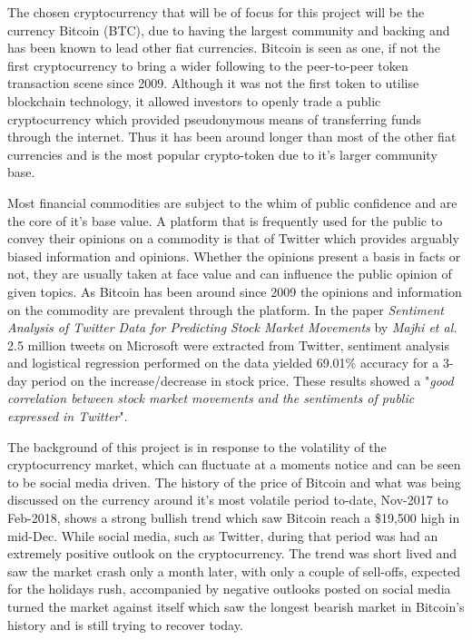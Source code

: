 \documentclass[oneside, 10pt]{article}
\begin{document}
	The chosen cryptocurrency that will be of focus for this project will be the currency Bitcoin (BTC), due to having the largest community and backing and has been known to lead other fiat currencies. Bitcoin is seen as one, if not the first cryptocurrency to bring a wider following to the peer-to-peer token transaction scene since 2009. Although it was not the first token to utilise blockchain technology, it allowed investors to openly trade a public cryptocurrency which provided pseudonymous means of transferring funds through the internet. Thus it has been around longer than most of the other fiat currencies and is the most popular crypto-token due to it's larger community base.
	
	Most financial commodities are subject to the whim of public confidence and are the core of it's base value. A platform that is frequently used for the public to convey their opinions on a commodity is that of Twitter which provides arguably biased information and opinions. Whether the opinions present a basis in facts or not, they are usually taken at face value and can influence the public opinion of given topics. As Bitcoin has been around since 2009 the opinions and information on the commodity are prevalent through the platform. 
	In the paper \textit{Sentiment Analysis of Twitter Data for Predicting Stock Market Movements} by \textit{Majhi et al.} \cite{1} 2.5 million tweets on Microsoft were extracted from Twitter, sentiment analysis and logistical regression performed on the data yielded 69.01\% accuracy for a 3-day period on the increase/decrease in stock price. These results showed a "\textit{good correlation between stock market movements and the sentiments of public expressed in Twitter}".
	
	The background of this project is in response to the volatility of the cryptocurrency market, which can fluctuate at a moments notice and can be seen to be social media driven. The history of the price of Bitcoin and what was being discussed on the currency around it's most volatile period to-date, Nov-2017 to Feb-2018, shows a strong bullish trend which saw Bitcoin reach a \$19,500 high in mid-Dec. While social media, such as Twitter, during that period was had an extremely positive outlook on the cryptocurrency. The trend was short lived and saw the market crash only a month later, with only a couple of sell-offs, expected for the holidays rush, accompanied by negative outlooks posted on social media turned the market against itself which saw the longest bearish market in Bitcoin's history and is still trying to recover today.
	
\end{document}
